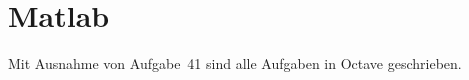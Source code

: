 \chapter{Matlab}

\addtocounter{section}{38}

Mit Ausnahme von Aufgabe~41 sind alle Aufgaben in Octave geschrieben.







